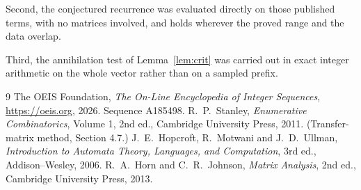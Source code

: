\documentclass[11pt,a4paper]{article}
\theoremstyle{plain}
\theoremstyle{definition}
\begin{document}
Second, the conjectured recurrence was evaluated directly on those published terms, with no
matrices involved, and holds wherever the proved range and the data overlap.

Third, the annihilation test of Lemma~\ref{lem:crit} was carried out in exact integer
arithmetic on the whole vector rather than on a sampled prefix.

\begin{thebibliography}{9}
 The OEIS Foundation, \emph{The On-Line Encyclopedia of Integer
Sequences}, \url{https://oeis.org}, 2026. Sequence A185498.
 R.~P.~Stanley, \emph{Enumerative Combinatorics}, Volume 1, 2nd ed.,
Cambridge University Press, 2011. (Transfer-matrix method, Section 4.7.)
 J.~E.~Hopcroft, R.~Motwani and J.~D.~Ullman, \emph{Introduction to Automata
Theory, Languages, and Computation}, 3rd ed., Addison--Wesley, 2006.
 R.~A.~Horn and C.~R.~Johnson, \emph{Matrix Analysis}, 2nd ed., Cambridge
University Press, 2013.
\end{thebibliography}
\end{document}
